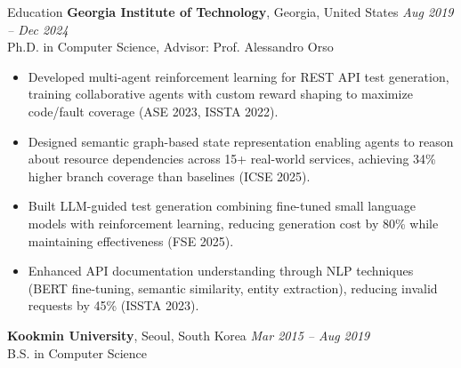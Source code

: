 \documentclass{resume} %
\begin{document}

\begin{rSection}{Education}
{\bf Georgia Institute of Technology}, Georgia, United States \hfill {\em Aug 2019 -- Dec 2024} \\
Ph.D. in Computer Science, Advisor: Prof. Alessandro Orso
\begin{itemize}
    \item Developed multi-agent reinforcement learning for REST API test generation, training collaborative agents with custom reward shaping to maximize code/fault coverage (ASE 2023, ISSTA 2022).
    \item Designed semantic graph-based state representation enabling agents to reason about resource dependencies across 15+ real-world services, achieving 34\% higher branch coverage than baselines (ICSE 2025).
    \item Built LLM-guided test generation combining fine-tuned small language models with reinforcement learning, reducing generation cost by 80\% while maintaining effectiveness (FSE 2025).
    \item Enhanced API documentation understanding through NLP techniques (BERT fine-tuning, semantic similarity, entity extraction), reducing invalid requests by 45\% (ISSTA 2023).
\end{itemize}

{\bf Kookmin University}, Seoul, South Korea \hfill {\em Mar 2015 -- Aug 2019} \\
B.S. in Computer Science
\end{rSection}


\end{document}

